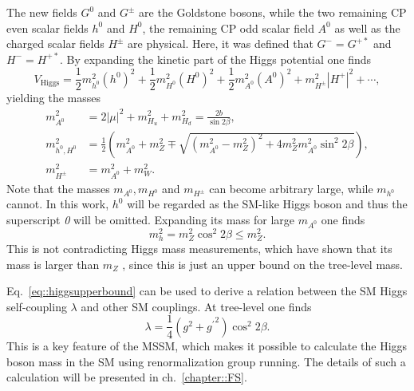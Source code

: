 \documentclass[a4paper,12pt]{book}
\begin{document}
The new fields $G^0$ and $G^\pm$ are the Goldstone bosons, while the two remaining  CP even scalar fields $h^0$ and $H^0$, the remaining CP odd scalar field $A^0$ as well as the charged scalar fields $H^\pm$ are physical. Here, it was defined that $G^- = G^{+*}$ and $H^- = H^{+*}$. By expanding the kinetic part of the Higgs potential one finds
\begin{equation}
V_\text{Higgs} = \frac{1}{2} m_{h^0}^2 (h^{0})^2 + \frac{1}{2} m_{H^0}^2 (H^{0})^2 
+ \frac{1}{2} m_{A^0}^2 (A^{0})^2 +  m_{H^\pm}^2 |H^+|^2 + \cdots,
\end{equation}
yielding the masses
\begin{align}
m_{A^0}^2 &= 2|\mu|^2 + m^2_{H_u} + m^2_{H_d} = \frac{2b}{\sin 2\beta},\\
m^2_{h^0, H^0} &= \frac{1}{2}\left(m^2_{A^0} + m_Z^2 \mp 
\sqrt{(m_{A^0}^2 - m_Z^2)^2 + 4 m_Z^2 m_{A^0}^2 \sin^2 2\beta}\right), 
\label{eq:HiggsmassMSSM}\\
m^2_{H^\pm} &= m^2_{A^0} + m_W^2.
\end{align}
Note that the masses $m_{A^0}, m_{H^0}$ and $m_{H^\pm}$ can become arbitrary large, while $m_{h^0}$ cannot. In this work, $h^0$ will be regarded as the SM-like Higgs boson and thus the superscript \textit{0} will be omitted. Expanding its mass for large $m_{A^0}$ one finds 
\begin{equation}
\label{eq::higgsupperbound}
m^2_h = m_Z^2 \cos^2 2\beta \leq m_Z^2.
\end{equation}  
This is not contradicting Higgs mass measurements, which have shown that its mass is larger than $m_Z$ \cite{higgsmeasurement1,higgsmeasurement2}, since this is just an upper bound on the tree-level mass.\par
Eq.\ \eqref{eq::higgsupperbound} can be used to derive a relation between the SM Higgs self-coupling $\lambda$ and other SM couplings. At tree-level one finds 
\begin{equation}
\lambda = \frac{1}{4}(g^2+{g^\prime}^2)\cos^2 2\beta.
\end{equation} 
This is a key feature of the MSSM, which makes it possible to calculate the Higgs boson mass in the SM using renormalization group running. The details of such a calculation will be presented in ch.\ \ref{chapter::FS}.
\end{document}

